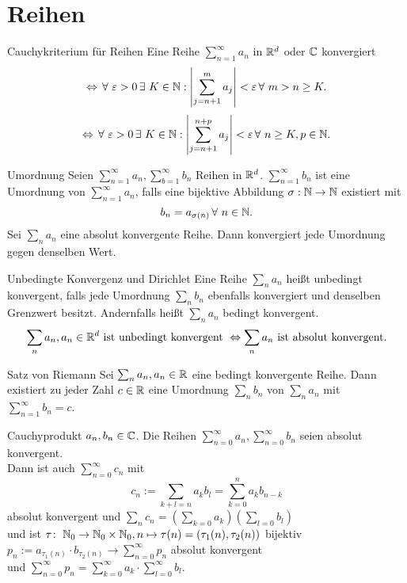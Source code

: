 \documentclass[main.tex]{subfiles}
\begin{document}
\section*{Reihen}
\begin{karte}{Cauchykriterium für Reihen}
    Eine Reihe \( \sum_{n=1}^\infty a_n \) 
    in \( \mathbb{R}^d \) oder \( \mathbb{C} \) konvergiert
    \[ \Leftrightarrow \, \forall \, 
    \varepsilon > 0 \,\exists \, K\in\N: 
    \abs{\sum_{j=n+1}^m a_j } < \varepsilon 
    \,\forall \, m>n\geq K. \]
    \[ \Leftrightarrow \, \forall \, 
    \varepsilon > 0 \,\exists \, K\in\N: 
    \abs{\sum_{j=n+1}^{n+p} a_j } < \varepsilon 
    \,\forall \, n\geq K, p\in\N. \]
\end{karte}
\begin{karte}{Umordnung}
    Seien \( \sum_{n=1}^\infty a_n, 
    \sum_{b=1}^\infty b_n \) Reihen 
    in \( \mathbb{R}^d \). \( \sum_{n=1}^\infty b_n \) 
    ist eine Umordnung von 
    \( \sum_{n=1}^\infty a_n \), falls eine 
    bijektive Abbildung \( \sigma:\mathbb{N}\rightarrow\mathbb{N} \) 
    existiert mit
    \[ b_n = a_{\sigma(n)} \,\forall \, n\in\N. \]
    Sei \( \sum_n a_n \) eine absolut konvergente Reihe. 
    Dann konvergiert jede Umordnung gegen denselben Wert.
\end{karte}
\begin{karte}{Unbedingte Konvergenz und Dirichlet}
    Eine Reihe \( \sum_n a_n \) heißt unbedingt konvergent, 
    falls jede Umordnung \( \sum_n b_n \) ebenfalls 
    konvergiert und denselben Grenzwert besitzt. 
    Andernfalls heißt \( \sum_n a_n \) bedingt konvergent.
    \[ \sum_n a_n, a_n \in\mathbb{R}^d \text{ ist unbedingt konvergent } 
    \Leftrightarrow \sum_n a_n \text{ ist absolut konvergent.} \]
\end{karte}
\begin{karte}{Satz von Riemann}
    Sei \( \sum_n a_n, a_n \in\mathbb{R} \) eine bedingt konvergente 
    Reihe. Dann existiert zu jeder Zahl \( c\in\mathbb{R} \) eine 
    Umordnung \( \sum_n b_n \) von \( \sum_n a_n \) mit 
    \( \sum_{n=1}^\infty b_n = c \).
\end{karte}
\begin{karte}{Cauchyprodukt}
    \( a_n, b_n \in\mathbb{C} \). Die Reihen 
    \( \sum_{n=0}^\infty a_n, \sum_{n=0}^\infty b_n \) 
    seien absolut konvergent.\\
    Dann ist auch \( \sum_{n=0}^\infty c_n \) mit 
    \[ c_n := \sum_{k+l=n} a_k b_l = \sum_{k=0}^n a_k b_{n-k} \]
    absolut konvergent und \( \sum_n c_n 
    = ( \sum_{k=0} a_k )( \sum_{l=0} b_l ) \) \\
    und ist \(\tau \colon \; \mathbb{N}_0 \rightarrow \mathbb{N}_0 \times \mathbb{N}_0, 
    n \mapsto \tau(n) = (\tau_1(n), \tau_2(n)) \) bijektiv
    \( p_n := a_{\tau_1(n)} \cdot b_{\tau_2(n)} \rightarrow 
    \sum_{n=0}^\infty p_n \) absolut konvergent \\
    und \( \sum_{n=0}^\infty p_n = \sum_{k=0}^\infty 
    a_k \cdot \sum_{l=0}^\infty b_l \).
\end{karte}
\end{document}
